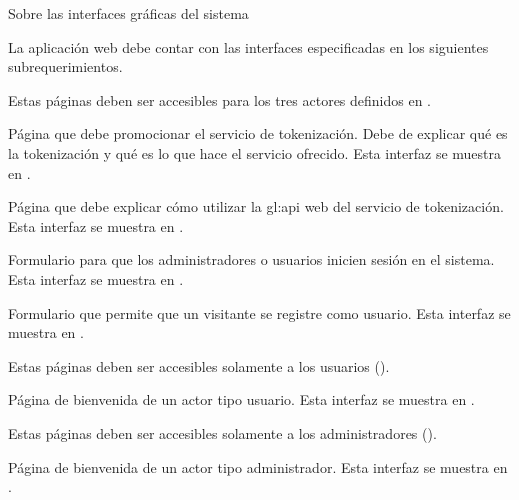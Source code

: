 {Sobre las interfaces gráficas del sistema}
{
  La aplicación web debe contar con las interfaces especificadas en los
  siguientes subrequerimientos.

  {
    Estas páginas deben ser accesibles para los tres actores definidos en
    .

    {
      Página que debe promocionar el servicio de tokenización. Debe de explicar
      qué es la tokenización y qué es lo que hace el servicio ofrecido. Esta
      interfaz se muestra en .
    }

    {
      Página que debe explicar cómo utilizar la \gls{gl:api} web del
      servicio de tokenización. Esta interfaz se muestra en
      .
    }

    {
      Formulario para que los administradores o usuarios inicien sesión en el
      sistema. Esta interfaz se muestra en .
    }

    {
       Formulario que permite que un visitante se registre como usuario.
       Esta interfaz se muestra en .
    }
  }

  {
    Estas páginas deben ser accesibles solamente a los usuarios
    ().

    {
       Página de bienvenida de un actor tipo usuario. Esta interfaz se
       muestra en .
    }
  }

  {
    Estas páginas deben ser accesibles solamente a los administradores
    ().

    {
      Página de bienvenida de un actor tipo administrador. Esta interfaz se
      muestra en .
    }
  }
}

